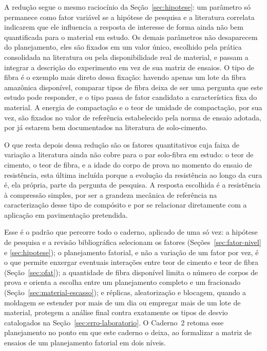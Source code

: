 \documentclass{doeapostila}
\begin{document}
A redução segue o mesmo raciocínio da Seção~\ref{sec:hipotese}: um
parâmetro só permanece como fator variável se a hipótese de pesquisa e a
literatura correlata indicarem que ele influencia a resposta de interesse
de forma ainda não bem quantificada para o material em estudo. Os demais
parâmetros não desaparecem do planejamento, eles são fixados em um valor
único, escolhido pela prática consolidada na literatura ou pela
disponibilidade real de material, e passam a integrar a descrição do
experimento em vez de sua matriz de ensaios. O tipo de fibra é o exemplo
mais direto dessa fixação: havendo apenas um lote da fibra amazônica
disponível, comparar tipos de fibra deixa de ser uma pergunta que este
estudo pode responder, e o tipo passa de fator candidato a característica
fixa do material. A energia de compactação e o teor de umidade de
compactação, por sua vez, são fixados no valor de referência estabelecido
pela norma de ensaio adotada, por já estarem bem documentados na literatura
de solo-cimento.

O que resta depois dessa redução são os fatores quantitativos cuja faixa de
variação a literatura ainda não cobre para o par solo-fibra em estudo: o
teor de cimento, o teor de fibra, e a idade do corpo de prova no momento do
ensaio de resistência, esta última incluída porque a evolução da
resistência ao longo da cura é, ela própria, parte da pergunta de pesquisa.
A resposta escolhida é a resistência à compressão simples, por ser a
grandeza mecânica de referência na caracterização desse tipo de compósito e
por se relacionar diretamente com a aplicação em pavimentação pretendida.

Esse é o padrão que percorre todo o caderno, aplicado de uma só vez: a
hipótese de pesquisa e a revisão bibliográfica selecionam os fatores
(Seções~\ref{sec:fator-nivel} e \ref{sec:hipotese}); o planejamento
fatorial, e não a variação de um fator por vez, é o que permite enxergar
eventuais interações entre teor de cimento e teor de fibra
(Seção~\ref{sec:ofat}); a quantidade de fibra disponível limita o número de
corpos de prova e orienta a escolha entre um planejamento completo e um
fracionado (Seção~\ref{sec:material-escasso}); e réplicas, aleatorização e
blocagem, quando a moldagem se estender por mais de um dia ou empregar mais
de um lote de material, protegem a análise final contra exatamente os tipos
de desvio catalogados na Seção~\ref{sec:erro-laboratorio}. O Caderno~2
retoma esse planejamento no ponto em que este caderno o deixa, ao formalizar
a matriz de ensaios de um planejamento fatorial em dois níveis.

\paginadireitos
\end{document}
